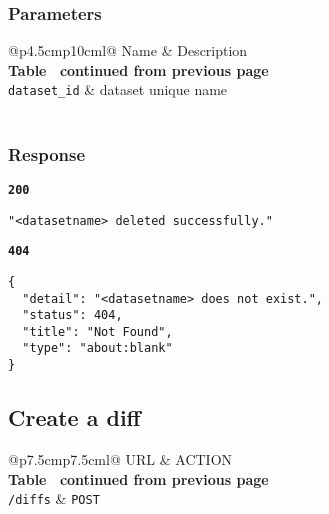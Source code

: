 \subsubsection{Parameters}
\begin{longtable}[c]{@{}p{4.5cm}p{10cm}l@{}}
  \toprule
  Name                 & Description                          \\* \midrule
  \endfirsthead
  \multicolumn{3}{c}%
  {{\bfseries Table \thetable\ continued from previous page}} \\
  \endhead
  \bottomrule
  \endfoot
  \endlastfoot
  \texttt{dataset\_id} & dataset unique name                  \\* \bottomrule
  \label{tab:rdf-differ-get-diff-parameters}                  \\
\end{longtable}

\subsubsection{Response}
\textbf{\texttt{200}}
\begin{lstlisting}
"<datasetname> deleted successfully."
\end{lstlisting}

\textbf{\texttt{404}}
\begin{lstlisting}
{
  "detail": "<datasetname> does not exist.",
  "status": 404,
  "title": "Not Found",
  "type": "about:blank"
}
\end{lstlisting}

\subsection{Create a diff}

\begin{longtable}[c]{@{}p{7.5cm}p{7.5cm}l@{}}
  \toprule
  URL             & ACTION                                    \\* \midrule
  \endfirsthead
  \multicolumn{3}{c}%
  {{\bfseries Table \thetable\ continued from previous page}} \\
  \endhead
  \bottomrule
  \endfoot
  \endlastfoot
  \texttt{/diffs} & \texttt{POST}                             \\* \bottomrule
  \label{tab:rdf-differ-create-diffs}                         \\
\end{longtable}

